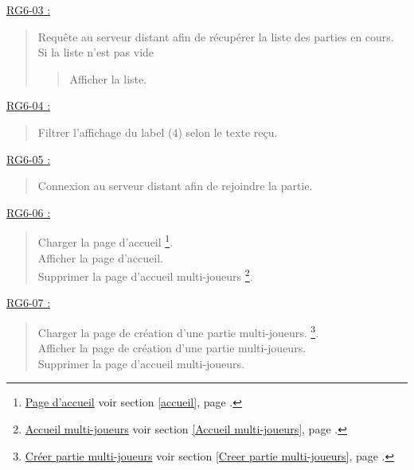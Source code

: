 \documentclass{report}
\begin{document}
				
			\underline{RG6-03 :}
				\begin{quote}
					Requête au serveur distant afin de récupérer la liste des parties en cours.\\
					Si la liste n'est pas vide
					\begin{quote}
						Afficher la liste.\\
					\end{quote}								
				\end{quote}


			\underline{RG6-04 :}
				\begin{quote}
					Filtrer l'affichage du label (4) selon le texte reçu.\\
				\end{quote}

				
			\underline{RG6-05 :}
				\begin{quote}
					Connexion au serveur distant afin de rejoindre la partie.\\
				\end{quote}

				
			\underline{RG6-06 :}
				\begin{quote}
					Charger la page d'accueil%
						\footnote[1]{
							\hyperlink{Page d'accueil}{Page d'accueil}
							\og voir section \ref{accueil}, page \pageref{accueil}.\fg
						}.\\
					Afficher la page d'accueil\footnotemark[1].\\
					Supprimer la page d'accueil multi-joueurs%
						\footnote[2]{
							\hyperlink{Accueil multi-joueurs}{Accueil multi-joueurs}
							\og voir section \ref{Accueil multi-joueurs}, page \pageref{Accueil multi-joueurs}.\fg
						}.\\
				\end{quote}


			\underline{RG6-07 :}
				\begin{quote}
					Charger la page de création d'une partie multi-joueurs.%
						\footnote[3]{
							\hyperlink{Creer partie multi-joueurs}{Créer partie multi-joueurs}
							\og voir section \ref{Creer partie multi-joueurs}, page \pageref{Creer partie multi-joueurs}.\fg
						}.\\
					Afficher la page de création d'une partie multi-joueurs\footnotemark[3].\\
					Supprimer la page d'accueil multi-joueurs\footnotemark[2].\\
				\end{quote}

\newpage
\end{document}
